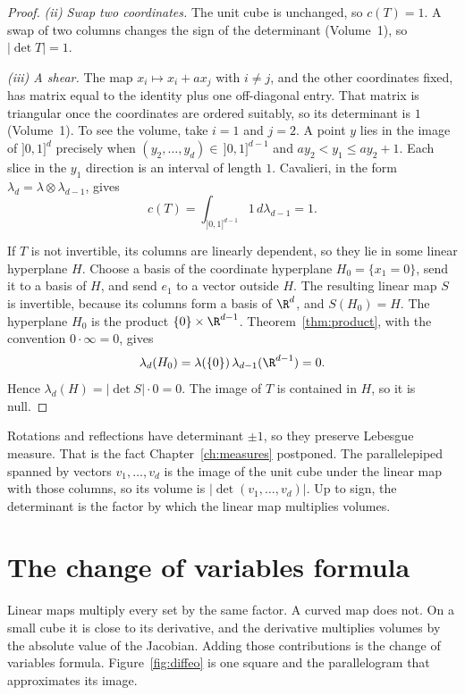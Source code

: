 \begin{proof}
\emph{(ii) Swap two coordinates.} The unit cube is unchanged, so $c(T)=1$. A swap of two columns changes the sign of the determinant (Volume~1), so $|\det T|=1$.

\emph{(iii) A shear.} The map $x_i\mapsto x_i+a x_j$ with $i\ne j$, and the other coordinates fixed, has matrix equal to the identity plus one off-diagonal entry. That matrix is triangular once the coordinates are ordered suitably, so its determinant is $1$ (Volume~1). To see the volume, take $i=1$ and $j=2$. A point $y$ lies in the image of $]0,1]^d$ precisely when $(y_2,\dots,y_d)\in\,]0,1]^{d-1}$ and $a y_2<y_1\le a y_2+1$. Each slice in the $y_1$ direction is an interval of length $1$. Cavalieri, in the form $\lambda_d=\lambda\otimes\lambda_{d-1}$, gives
\[
c(T)=\int_{]0,1]^{d-1}}1\,d\lambda_{d-1}=1.
\]

If $T$ is not invertible, its columns are linearly dependent, so they lie in some linear hyperplane $H$. Choose a basis of the coordinate hyperplane $H_0=\{x_1=0\}$, send it to a basis of $H$, and send $e_1$ to a vector outside $H$. The resulting linear map $S$ is invertible, because its columns form a basis of $\R^d$, and $S(H_0)=H$. The hyperplane $H_0$ is the product $\{0\}\times\R^{d-1}$. Theorem~\ref{thm:product}, with the convention $0\cdot\infty=0$, gives
\[
\lambda_d(H_0)=\lambda(\{0\})\,\lambda_{d-1}(\R^{d-1})=0.
\]
Hence $\lambda_d(H)=|\det S|\cdot 0=0$. The image of $T$ is contained in $H$, so it is null.
\end{proof}

Rotations and reflections have determinant $\pm 1$, so they preserve Lebesgue measure. That is the fact Chapter~\ref{ch:measures} postponed. The parallelepiped spanned by vectors $v_1,\dots,v_d$ is the image of the unit cube under the linear map with those columns, so its volume is $|\det(v_1,\dots,v_d)|$. Up to sign, the determinant is the factor by which the linear map multiplies volumes.

\section{The change of variables formula}

Linear maps multiply every set by the same factor. A curved map does not. On a small cube it is close to its derivative, and the derivative multiplies volumes by the absolute value of the Jacobian. Adding those contributions is the change of variables formula. Figure~\ref{fig:diffeo} is one square and the parallelogram that approximates its image.

